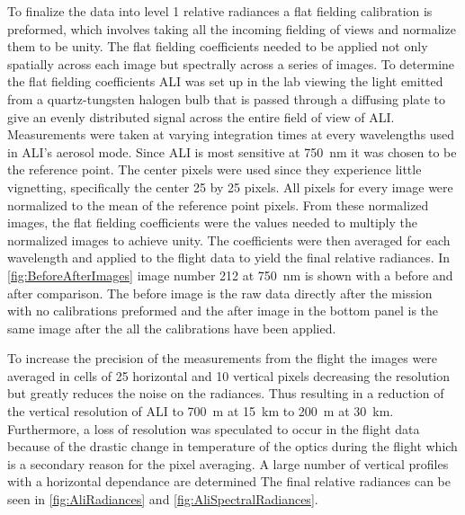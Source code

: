 \documentclass[12pt]{article}
\begin{document}
To finalize the data into level 1 relative radiances a flat fielding calibration is preformed, which involves taking all the incoming fielding of views and normalize them to be unity. The flat fielding coefficients needed to be applied not only spatially across each image but spectrally across a series of images. To determine the flat fielding coefficients ALI was set up in the lab viewing the light emitted from a quartz-tungsten halogen bulb that is passed through a diffusing plate to give an evenly distributed signal across the entire field of view of ALI. Measurements were taken at varying integration times at every wavelengths used in ALI's aerosol mode. Since ALI is most sensitive at 750~nm it was chosen to be the reference point. The center pixels were used since they experience little vignetting, specifically the center 25 by 25 pixels. All pixels for every image were normalized to the mean of the reference point pixels. From these normalized images, the flat fielding coefficients were the values needed to multiply the normalized images to achieve unity. The coefficients were then averaged for each wavelength and applied to the flight data to yield the final relative radiances. In \autoref{fig:BeforeAfterImages} image number 212 at 750~nm is shown with a before and after comparison. The before image is the raw data directly after the mission with no calibrations preformed and the after image in the bottom panel is the same image after the all the calibrations have been applied.


To increase the precision of the measurements from the flight the images were averaged in cells of 25 horizontal and 10 vertical pixels decreasing the resolution but greatly reduces the noise on the radiances. Thus resulting in a reduction of the vertical resolution of ALI to 700~m at 15~km to 200~m at 30~km. Furthermore, a loss of resolution was speculated to occur in the flight data because of the drastic change in temperature of the optics during the flight which is a secondary reason for the pixel averaging. A large number of vertical profiles with a horizontal dependance are determined The final relative radiances can be seen in \autoref{fig:AliRadiances} and \autoref{fig:AliSpectralRadiances}.
\end{document}
